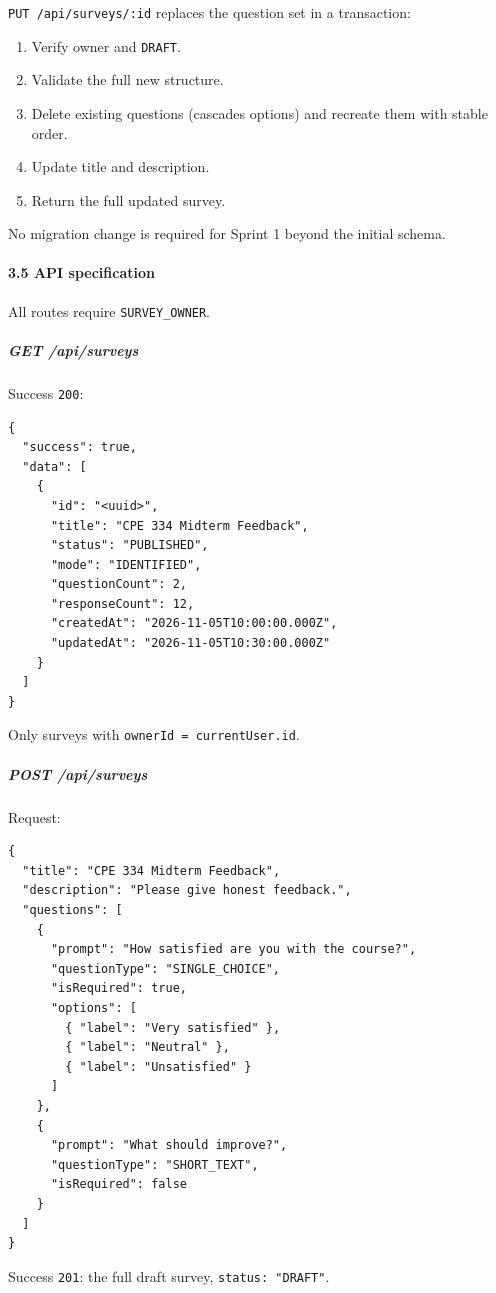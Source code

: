 \documentclass[12pt,a4paper]{article}
\begin{document}
\texttt{PUT /api/surveys/:id} replaces the question set in a transaction:

\begin{enumerate}[leftmargin=*]
\item Verify owner and \texttt{DRAFT}.
\item Validate the full new structure.
\item Delete existing questions (cascades options) and recreate them with stable order.
\item Update title and description.
\item Return the full updated survey.
\end{enumerate}

No migration change is required for Sprint 1 beyond the initial schema.

\paragraph*{3.5 API specification}
All routes require \texttt{SURVEY\_OWNER}.

\subparagraph*{GET /api/surveys}
Success \texttt{200}:

\begin{lstlisting}
{
  "success": true,
  "data": [
    {
      "id": "<uuid>",
      "title": "CPE 334 Midterm Feedback",
      "status": "PUBLISHED",
      "mode": "IDENTIFIED",
      "questionCount": 2,
      "responseCount": 12,
      "createdAt": "2026-11-05T10:00:00.000Z",
      "updatedAt": "2026-11-05T10:30:00.000Z"
    }
  ]
}
\end{lstlisting}

Only surveys with \texttt{ownerId = currentUser.id}.

\subparagraph*{POST /api/surveys}
Request:

\begin{lstlisting}
{
  "title": "CPE 334 Midterm Feedback",
  "description": "Please give honest feedback.",
  "questions": [
    {
      "prompt": "How satisfied are you with the course?",
      "questionType": "SINGLE_CHOICE",
      "isRequired": true,
      "options": [
        { "label": "Very satisfied" },
        { "label": "Neutral" },
        { "label": "Unsatisfied" }
      ]
    },
    {
      "prompt": "What should improve?",
      "questionType": "SHORT_TEXT",
      "isRequired": false
    }
  ]
}
\end{lstlisting}

Success \texttt{201}: the full draft survey, \texttt{status: "DRAFT"}.
\end{document}
